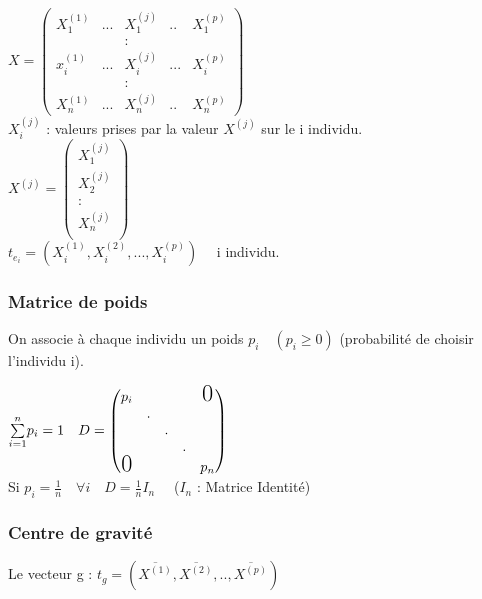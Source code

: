 \documentclass[a4paper, 12pt]{article}
\begin{document}
\begin{flushleft}
$X =
\begin{pmatrix}
   X^{(1)}_{1} & ... & X^{(j)}_{1} & .. & X^{(p)}_{1} \\
   & & : & & \\
   x^{(1)}_{i} & ... & X^{(j)}_{i} & ... & X^{(p)}_{i} \\
   & & : & & \\
   X^{(1)}_{n} & ... & X^{(j)}_{n} & .. & X^{(p)}_{n}
\end{pmatrix}
$ \\
\medskip
$X^{(j)}_{i}$ : valeurs prises par la valeur $X^{(j)}$ sur le i individu. \\
\medskip
$
X^{(j)} =
\begin{pmatrix}
X^{(j)}_{1} \\
X^{(j)}_{2} \\
: \\
X^{(j)}_{n} \\
\end{pmatrix}
$ \\
\medskip
$t_{e_{i}} = (X^{(1)}_i, X^{(2)}_i, ..., X^{(p)}_i) \quad$ i individu. \\
\end{flushleft}


\subsubsection{Matrice de poids}
On associe à chaque individu un poids $p_i \quad (p_i \geq 0)$ (probabilité de choisir l'individu i). \\

\begin{flushleft}
$\overset{n}{\underset{i = 1}{\sum}} p_i = 1 \quad D = 
\begin{pmatrix}
p_i & & & & \text{\LARGE 0} \\
& . & & & \\
& & . & & \\
& & & .  &\\
\text{\LARGE 0} & & & & p_n \\
\end{pmatrix}
$ \\
\medskip
Si $p_i = \frac{1}{n} \quad \forall i \quad D = \frac{1}{n} I_n \quad$ ($I_n$ : Matrice Identité) \\
\end{flushleft}


\subsubsection{Centre de gravité}
Le vecteur g : $t_g = (\overline{X^{(1)}}, \overline{X^{(2)}}, .., \overline{X^{(p)}})$ \\
\end{document}
